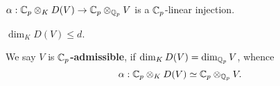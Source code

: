 \begin{proposition}
    $\alpha : \mathbb{C}_p\otimes_{K} D(V)\to\mathbb{C}_p\otimes_{\mathbb{Q}_p}V$ is a $\mathbb{C}_p$-linear injection.
\end{proposition}
\begin{corollary}
    $\dim_K D(V)\le d$.
\end{corollary}

We say $V$ is \textbf{$\mathbb{C}_p$-admissible},
if $\dim_K D(V) = \dim_{\mathbb{Q}_p} V$,
whence \[\alpha : \mathbb{C}_p\otimes_{K} D(V)\simeq\mathbb{C}_p\otimes_{\mathbb{Q}_p} V.\]


